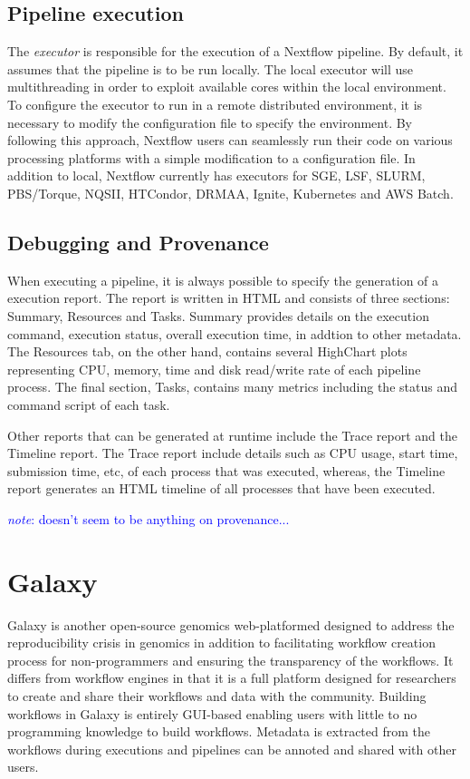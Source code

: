 \documentclass{report}
\newcommand{\note}[1]{\textcolor{blue}{\textit{note}: #1}}
\begin{document}
        \subsection{Pipeline execution} The \textit{executor} is responsible for
        the execution of a Nextflow pipeline. By default, it assumes that the
        pipeline is to be run locally. The local executor will use
        multithreading in order to exploit available cores within the local
        environment. To configure the executor to run in a remote distributed
        environment, it is necessary to modify the configuration file to specify
        the environment. By following this approach, Nextflow users can
        seamlessly run their code on various processing platforms with a simple
        modification to a configuration file. In addition to local, Nextflow
        currently has executors for SGE, LSF, SLURM, PBS/Torque, NQSII,
        HTCondor, DRMAA, Ignite, Kubernetes and AWS Batch.

        \subsection{Debugging and Provenance} When executing a pipeline, it is
        always possible to specify the generation of a execution report. The
        report is written in HTML and consists of three sections: Summary,
        Resources and Tasks. Summary provides details on the execution command,
        execution status, overall execution time, in addtion to other metadata.
        The Resources tab, on the other hand, contains several HighChart plots
        representing CPU, memory, time and disk read/write rate of each pipeline
        process. The final section, Tasks, contains many metrics including the
        status and command script of each task. 

    Other reports that can be generated at runtime include the Trace report and
    the Timeline report. The Trace report include details such as CPU usage,
    start time, submission time, etc, of each process that was executed,
    whereas, the Timeline report generates an HTML timeline of all processes
    that have been executed.        

    \note{doesn't seem to be anything on provenance...}

    \section{Galaxy}
        Galaxy is another open-source genomics web-platformed designed to 
        address the
        reproducibility crisis in genomics in addition to facilitating workflow
        creation process for non-programmers and ensuring the transparency of 
        the workflows. It differs from workflow engines in that it is a full
        platform designed for researchers to create and share their workflows
        and data with the community. Building workflows in Galaxy is
        entirely GUI-based enabling users with little to no programming
        knowledge to build workflows. Metadata is extracted from the workflows
        during executions and pipelines can be annoted and shared with other 
        users.
\end{document}
